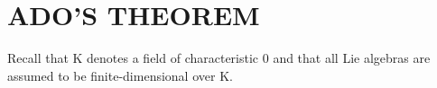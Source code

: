 \section{ADO'S THEOREM}

Recall that K denotes a field of characteristic 0 and that all Lie algebras are assumed to be finite-dimensional over K.

